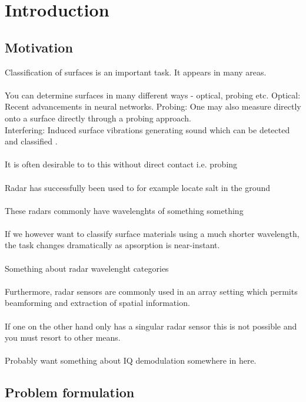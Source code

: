 \documentclass[a4paper, 12pt]{article}
\begin{document}
\section{Introduction}


\subsection{Motivation}

Classification of surfaces is an important task. It appears in many areas.
\\ \\
You can determine surfaces in many different ways - optical, probing etc.
\noindent Optical: Recent advancements in neural networks. 
\noindent Probing: One may also measure directly onto a surface directly through a probing approach. \\
\noindent Interfering: Induced surface vibrations generating sound which can be detected and classified  \cite{ct:surfdet}.
\\ \\
It is often desirable to to this without direct contact i.e. probing
\\ \\
Radar has successfully been used to for example locate salt in the ground
\\ \\
These radars commonly have wavelenghts of something something
\\ \\
If we however want to classify surface materials using a much shorter wavelength, the task changes dramatically as apsorption is near-instant. 
\\ \\
Something about radar wavelenght categories
\\ \\
Furthermore, radar sensors are commonly used in an array setting which permits beamforming and extraction of spatial information. 
\\ \\
If one on the other hand only has a singular radar sensor this is not possible and you must resort to other means.
\\ \\
Probably want something about IQ demodulation somewhere in here.

\subsection{Problem formulation}
\end{document}
